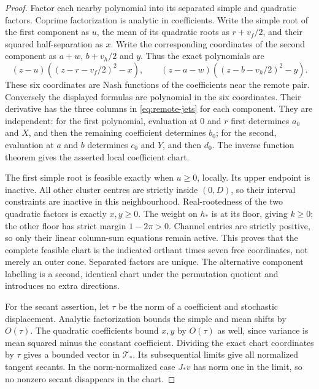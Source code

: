 \begin{proof}
Factor each nearby polynomial into its separated simple and quadratic
factors. Coprime factorization is analytic in coefficients. Write the
simple root of the first component as $u$, the mean of its quadratic
roots as $r+v_f/2$, and their squared half-separation as $x$. Write the
corresponding coordinates of the second component as $a+w$, $b+v_h/2$
and $y$. Thus the exact polynomials are
\[
 (z-u)((z-r-v_f/2)^2-x),\qquad
 (z-a-w)((z-b-v_h/2)^2-y).
\]
These six coordinates are Nash functions of the coefficients near the
remote pair. Conversely the displayed formulas are polynomial in the
six coordinates. Their derivative has the three columns in
\eqref{eq:remote-jets} for each component. They are independent:
for the first polynomial, evaluation at $0$ and $r$ first determines
$a_0$ and $X$, and then the remaining coefficient determines $b_0$;
for the second, evaluation at $a$ and $b$ determines $c_0$ and $Y$,
and then $d_0$. The inverse function theorem gives the asserted local
coefficient chart.

The first simple root is feasible exactly when $u\ge0$, locally.
Its upper endpoint is inactive. All other cluster centres are strictly
inside $(0,D)$, so their interval constraints are inactive in this
neighbourhood. Real-rootedness of the two quadratic factors is exactly
$x,y\ge0$. The weight on $h_*$ is at its floor, giving $k\ge0$;
the other floor has strict margin $1-2\pi>0$. Channel entries are
strictly positive, so only their linear column-sum equations remain
active. This proves that the complete feasible chart is the indicated
orthant times seven free coordinates, not merely an outer cone.
Separated factors are unique. The alternative component labelling is a
second, identical chart under the permutation quotient and introduces
no extra directions.

For the secant assertion, let $\tau$ be the norm of a coefficient and
stochastic displacement. Analytic factorization bounds the simple and
mean shifts by $O(\tau)$. The quadratic coefficients bound $x,y$ by
$O(\tau)$ as well, since variance is mean squared minus the constant
coefficient. Dividing the exact chart coordinates by $\tau$ gives a
bounded vector in $\mathcal T_*$. Its subsequential limits give all
normalized tangent secants. In the norm-normalized case $J_*v$ has
norm one in the limit, so no nonzero secant disappears in the chart.


\end{proof}
